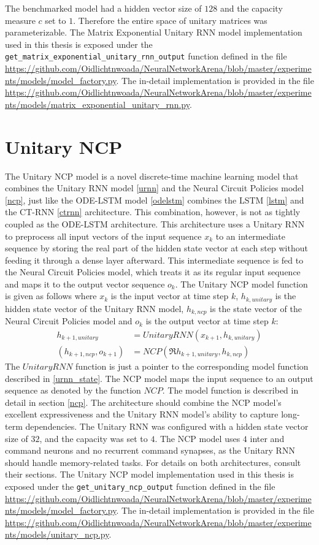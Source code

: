 \documentclass[draft,final]{vutinfth} %
\begin{document}
The benchmarked model had a hidden vector size of $128$ and the capacity measure $c$ set to $1$. Therefore the entire space of unitary matrices was parameterizable.
The Matrix Exponential Unitary RNN model implementation used in this thesis is exposed under the \texttt{get\_matrix\_exponential\_unitary\_rnn\_output} function defined in the file \url{https://github.com/Oidlichtnwoada/NeuralNetworkArena/blob/master/experiments/models/model_factory.py}.
The in-detail implementation is provided in the file \url{https://github.com/Oidlichtnwoada/NeuralNetworkArena/blob/master/experiments/models/matrix_exponential_unitary_rnn.py}.


\section{Unitary NCP} \label{uncp}
The Unitary NCP model is a novel discrete-time machine learning model that combines the Unitary RNN model \ref{urnn} and the Neural Circuit Policies model \ref{ncp}, just like the ODE-LSTM model \ref{odelstm} combines the LSTM \ref{lstm} and the CT-RNN \ref{ctrnn} architecture.
This combination, however, is not as tightly coupled as the ODE-LSTM architecture.
This architecture uses a Unitary RNN to preprocess all input vectors of the input sequence $x_k$ to an intermediate sequence by storing the real part of the hidden state vector at each step without feeding it through a dense layer afterward.
This intermediate sequence is fed to the Neural Circuit Policies model, which treats it as its regular input sequence and maps it to the output vector sequence $o_k$.
The Unitary NCP model function is given as follows where $x_k$ is the input vector at time step $k$, $h_{k,unitary}$ is the hidden state vector of the Unitary RNN model, $h_{k,ncp}$ is the state vector of the Neural Circuit Policies model and $o_k$ is the output vector at time step $k$:
\begin{align}
h_{k+1,unitary} &= UnitaryRNN(x_{k+1}, h_{k,unitary}) \\
(h_{k+1,ncp}, o_{k+1}) &= NCP(\Re{h_{k+1,unitary}}, h_{k,ncp})
\end{align}
The $UnitaryRNN$ function is just a pointer to the corresponding model function described in \ref{urnn_state}.
The NCP model maps the input sequence to an output sequence as denoted by the function $NCP$. The model function is described in detail in section \ref{ncp}.
The architecture should combine the NCP model's excellent expressiveness and the Unitary RNN model's ability to capture long-term dependencies.
The Unitary RNN was configured with a hidden state vector size of $32$, and the capacity was set to $4$.
The NCP model uses $4$ inter and command neurons and no recurrent command synapses, as the Unitary RNN should handle memory-related tasks.
For details on both architectures, consult their sections.
The Unitary NCP model implementation used in this thesis is exposed under the \texttt{get\_unitary\_ncp\_output} function defined in the file \url{https://github.com/Oidlichtnwoada/NeuralNetworkArena/blob/master/experiments/models/model_factory.py}.
The in-detail implementation is provided in the file \url{https://github.com/Oidlichtnwoada/NeuralNetworkArena/blob/master/experiments/models/unitary_ncp.py}.
\end{document}
